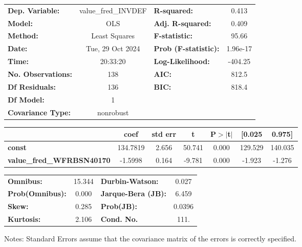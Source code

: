 \begin{center}
\begin{tabular}{lclc}
\toprule
\textbf{Dep. Variable:}           & value\_fred\_INVDEF & \textbf{  R-squared:         } &     0.413   \\
\textbf{Model:}                   &         OLS         & \textbf{  Adj. R-squared:    } &     0.409   \\
\textbf{Method:}                  &    Least Squares    & \textbf{  F-statistic:       } &     95.66   \\
\textbf{Date:}                    &   Tue, 29 Oct 2024  & \textbf{  Prob (F-statistic):} &  1.96e-17   \\
\textbf{Time:}                    &       20:33:20      & \textbf{  Log-Likelihood:    } &   -404.25   \\
\textbf{No. Observations:}        &           138       & \textbf{  AIC:               } &     812.5   \\
\textbf{Df Residuals:}            &           136       & \textbf{  BIC:               } &     818.4   \\
\textbf{Df Model:}                &             1       & \textbf{                     } &             \\
\textbf{Covariance Type:}         &      nonrobust      & \textbf{                     } &             \\
\bottomrule
\end{tabular}
\begin{tabular}{lcccccc}
                                  & \textbf{coef} & \textbf{std err} & \textbf{t} & \textbf{P$> |$t$|$} & \textbf{[0.025} & \textbf{0.975]}  \\
\midrule
\textbf{const}                    &     134.7819  &        2.656     &    50.741  &         0.000        &      129.529    &      140.035     \\
\textbf{value\_fred\_WFRBSN40170} &      -1.5998  &        0.164     &    -9.781  &         0.000        &       -1.923    &       -1.276     \\
\bottomrule
\end{tabular}
\begin{tabular}{lclc}
\textbf{Omnibus:}       & 15.344 & \textbf{  Durbin-Watson:     } &    0.027  \\
\textbf{Prob(Omnibus):} &  0.000 & \textbf{  Jarque-Bera (JB):  } &    6.459  \\
\textbf{Skew:}          &  0.285 & \textbf{  Prob(JB):          } &   0.0396  \\
\textbf{Kurtosis:}      &  2.106 & \textbf{  Cond. No.          } &     111.  \\
\bottomrule
\end{tabular}
\end{center}

Notes: \newline
 [1] Standard Errors assume that the covariance matrix of the errors is correctly specified.